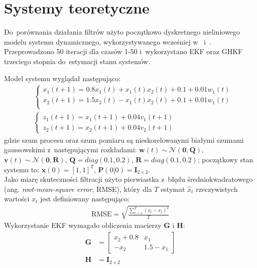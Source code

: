 \section{Systemy teoretyczne}
\label{sec:theoretical_systems}
Do~porównania działania filtrów użyto początkowo dyskretnego nieliniowego modelu systemu dynamicznego, wykorzystywanego wcześniej w~\cite{Liu} i~\cite{Germani}. Przeprowadzono 50 iteracji dla czasów 1-50 i~wykorzystano EKF oraz GHKF trzeciego stopnia do~estymacji stanu systemów.\par
Model systemu wyglądał następująco:
\begin{align}\label{eq:LiuModel1}
	&\left\{ 
	\begin{array}{l}
	x_1(t+1) = 0.8x_1(t) + x_1(t)x_2(t) + 0.1 + 0.01w_1(t) \\
	x_2(t+1) = 1.5x_2(t) - x_1(t)x_2(t) + 0.1 + 0.01w_1(t) \\
	\end{array}
	\right.\nonumber \\
	&\left\{ 
	\begin{array}{l}
	z_1(t+1) = x_1(t+1) + 0.04v_1(t+1) \\
	z_2(t+1) = x_2(t+1) + 0.04v_2(t+1)
	\end{array}
	\right.
\end{align}
gdzie szum procesu oraz szum pomiaru są nieskorelowanymi białymi szumami gaussowskimi z~następującymi rozkładami: $\boldsymbol{w}(t) \sim \mathcal{N}(\boldsymbol{0}, \boldsymbol{Q})$, $\boldsymbol{v}(t) \sim \mathcal{N}(\boldsymbol{0}, \boldsymbol{R})$, $\boldsymbol{Q}=diag(0.1, 0.2)$, $\boldsymbol{R}=diag(0.1, 0.2)$; początkowy stan systemu to: $\boldsymbol{x}(0) = [1,1]^T$, $\boldsymbol{P}(0|0) = \boldsymbol{I}_{2 \times 2}$.\\ 
Jako miarę skuteczności filtracji użyto pierwiastka z~błędu średniokwadratowego (ang. \textit{root-mean-square error}, RMSE), który dla $T$ estymat $\hat{x}_t$ rzeczywistych wartości $x_t$ jest definiowany następująco:
\begin{align}\label{eq:rmse}
\text{RMSE} = \sqrt{\frac{\sum_{t=1}^{T}(\hat{x}_t - x_t)^2}{T}}
\end{align}
Wykorzystanie EKF wymagało obliczenia macierzy $\boldsymbol{G}$ i $\boldsymbol{H}$:
\begin{align}\label{eq:LiuModel1GH}
\boldsymbol{G}&=
\begin{bmatrix}
x_2 + 0.8 & x_1 \\
-x_2 & 1.5 - x_1
\end{bmatrix} \nonumber \\
\boldsymbol{H}&=\boldsymbol{I}_{2 \times 2}
\end{align}
